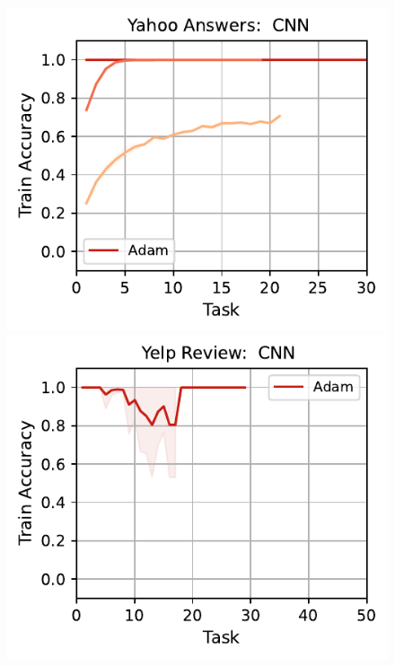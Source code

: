 \begin{figure}[htb!]
{    \includegraphics[width=\textwidth]{figs/Accuracy/nlp/cnn/yahoo_answers_50.pdf}
    \includegraphics[width=\textwidth]{figs/Accuracy/nlp/cnn/yelp_review_full_50.pdf}
    }
    \\
    \resizebox{\textwidth}{!}{  
}
\end{figure}
